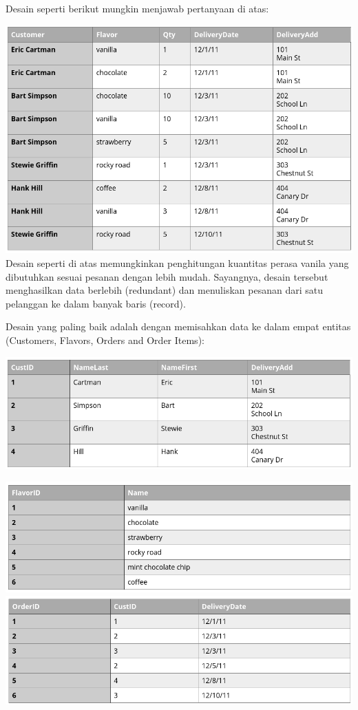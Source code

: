 \documentclass[]{book}
\begin{document}
Desain seperti berikut mungkin menjawab pertanyaan di atas:

\includegraphics{./img/tab3_order.png}
Desain seperti di atas memungkinkan penghitungan kuantitas perasa vanila yang dibutuhkan sesuai pesanan dengan lebih mudah. Sayangnya, desain tersebut menghasilkan data berlebih (redundant) dan menuliskan pesanan dari satu pelanggan ke dalam banyak baris (record).

Desain yang paling baik adalah dengan memisahkan data ke dalam empat entitas (Customers, Flavors, Orders and Order Items):

\includegraphics{./img/tab4_order.png}

\includegraphics{./img/tab5_order.png}
\includegraphics{./img/tab6_order.png}
\end{document}
